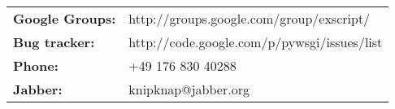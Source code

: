 \begin{tabular}{ll}
{\bf Google Groups:} & http://groups.google.com/group/exscript/ \\
{\bf Bug tracker:}   & http://code.google.com/p/pywsgi/issues/list \\
{\bf Phone:}         & +49 176 830 40288 \\
{\bf Jabber:}        & knipknap@jabber.org
\end{tabular}
